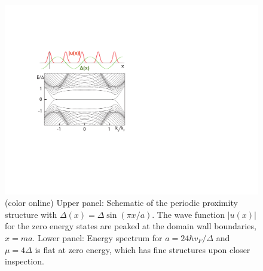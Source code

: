 \begin{figure}[h]
\includegraphics[width=\textwidth]{include/fig3.pdf}
\caption{(color online) Upper panel: Schematic of the periodic proximity structure with 
$\Delta(x)=\Delta  \sin(\pi x/a)$. The wave function $|u(x)|$ for the zero energy states
are peaked at the domain wall boundaries, $x=ma$. Lower panel: Energy spectrum for 
$a=24\hbar v_F/\Delta$ and $\mu=4\Delta$ is flat at zero energy, which has fine structures upon closer inspection.
}\label{array}
\end{figure}


